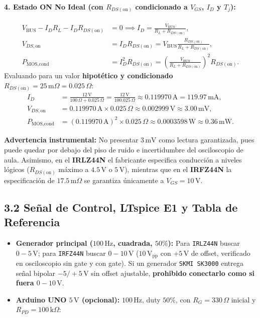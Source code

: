 \documentclass[10pt, a4paper, landscape]{article}
\begin{document}
\paragraph{4. Estado ON No Ideal (con $R_{DS(\text{on})}$ condicionado a $V_{GS}$, $I_D$ y $T_j$):}
\begin{align}
    V_{\text{BUS}} - I_D R_L - I_D R_{DS(\text{on})} &= 0 \implies I_D = \frac{V_{\text{BUS}}}{R_L + R_{DS(\text{on})}}, \\
    V_{DS,\text{on}} &= I_D R_{DS(\text{on})} = V_{\text{BUS}}\frac{R_{DS(\text{on})}}{R_L + R_{DS(\text{on})}}, \\
    P_{\text{MOS,cond}} &= I_D^2 R_{DS(\text{on})} = \left(\frac{V_{\text{BUS}}}{R_L + R_{DS(\text{on})}}\right)^2 R_{DS(\text{on})}.
\end{align}
Evaluando para un valor \textbf{hipotético y condicionado} $R_{DS(\text{on})} = 25\,\text{m}\Omega = 0.025\,\Omega$:
\begin{align*}
    I_D &= \frac{12\,\text{V}}{100\,\Omega + 0.025\,\Omega} = \frac{12\,\text{V}}{100.025\,\Omega} \approx 0.119970\,\text{A} = 119.97\,\text{mA}, \\
    V_{DS,\text{on}} &= 0.119970\,\text{A} \times 0.025\,\Omega \approx 0.002999\,\text{V} \approx 3.00\,\text{mV}, \\
    P_{\text{MOS,cond}} &= (0.119970\,\text{A})^2 \times 0.025\,\Omega \approx 0.0003598\,\text{W} \approx 0.36\,\text{mW}.
\end{align*}

\textbf{Advertencia instrumental:} No presentar $3\,\text{mV}$ como lectura garantizada, pues puede quedar por debajo del piso de ruido e incertidumbre del osciloscopio de aula. Asimismo, en el \textbf{IRLZ44N} el fabricante especifica conducción a niveles lógicos ($R_{DS(\text{on})}$ máximo a $4.5\,\text{V}$ o $5\,\text{V}$), mientras que en el \textbf{IRFZ44N} la especificación de $17.5\,\text{m}\Omega$ se garantiza únicamente a $V_{GS} = 10\,\text{V}$.

\subsection*{3.2 Señal de Control, LTspice E1 y Tabla de Referencia}
\begin{itemize}[noitemsep, topsep=2pt]
    \item \textbf{Generador principal ($100\,\text{Hz}$, cuadrada, $50\%$):} Para \texttt{IRLZ44N} buscar $0-5\,\text{V}$; para \texttt{IRFZ44N} buscar $0-10\,\text{V}$ ($10\,\text{V}_{\text{pp}}$ con $+5\,\text{V}$ de offset, verificado en osciloscopio sin gate y con gate). Si un generador \texttt{SKMI SK3000} entrega señal bipolar $-5/+5\,\text{V}$ sin offset ajustable, \textbf{prohibido conectarlo como si fuera $0-10\,\text{V}$}.
    \item \textbf{Arduino UNO $5\,\text{V}$ (opcional):} $100\,\text{Hz}$, duty $50\%$, con $R_G = 330\,\Omega$ inicial y $R_{PD} = 100\,\text{k}\Omega$:
\end{itemize}
\end{document}
